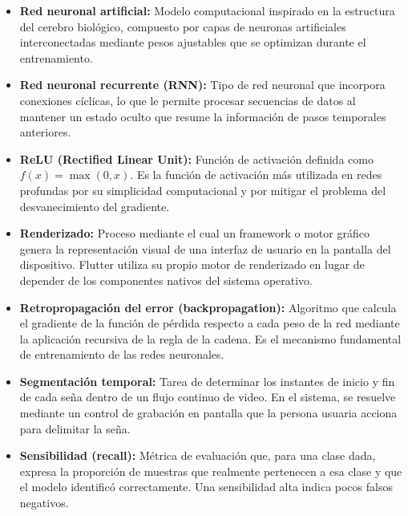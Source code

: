 \begin{itemize}
    \item[] \textbf{Red neuronal artificial:} Modelo computacional inspirado en la estructura del cerebro biológico, compuesto por capas de neuronas artificiales interconectadas mediante pesos ajustables que se optimizan durante el entrenamiento.\\

    \item[] \textbf{Red neuronal recurrente (RNN):} Tipo de red neuronal que incorpora conexiones cíclicas, lo que le permite procesar secuencias de datos al mantener un estado oculto que resume la información de pasos temporales anteriores.\\

    \item[] \textbf{ReLU (Rectified Linear Unit):} Función de activación definida como $f(x) = \max(0, x)$. Es la función de activación más utilizada en redes profundas por su simplicidad computacional y por mitigar el problema del desvanecimiento del gradiente.\\

    \item[] \textbf{Renderizado:} Proceso mediante el cual un framework o motor gráfico genera la representación visual de una interfaz de usuario en la pantalla del dispositivo. Flutter utiliza su propio motor de renderizado en lugar de depender de los componentes nativos del sistema operativo.\\

    \item[] \textbf{Retropropagación del error (backpropagation):} Algoritmo que calcula el gradiente de la función de pérdida respecto a cada peso de la red mediante la aplicación recursiva de la regla de la cadena. Es el mecanismo fundamental de entrenamiento de las redes neuronales.\\

    \item[] \textbf{Segmentación temporal:} Tarea de determinar los instantes de inicio y fin de cada seña dentro de un flujo continuo de video. En el sistema, se resuelve mediante un control de grabación en pantalla que la persona usuaria acciona para delimitar la seña.\\

    \item[] \textbf{Sensibilidad (recall):} Métrica de evaluación que, para una clase dada, expresa la proporción de muestras que realmente pertenecen a esa clase y que el modelo identificó correctamente. Una sensibilidad alta indica pocos falsos negativos.\\


\end{itemize}
